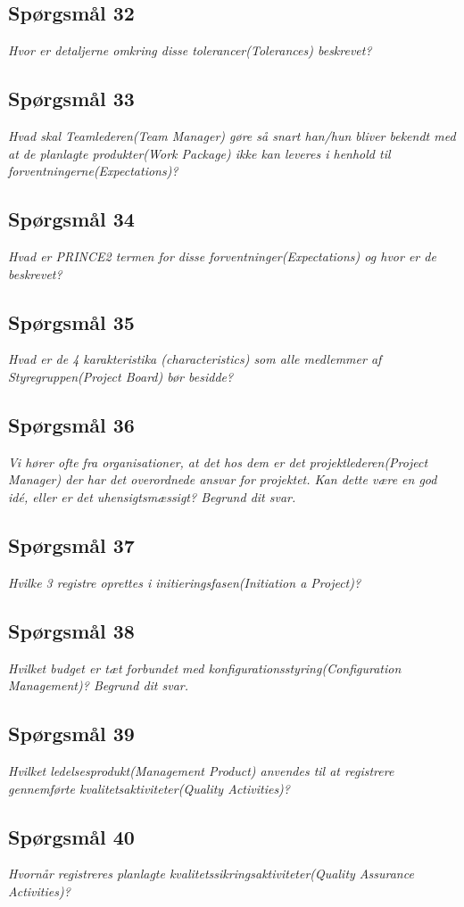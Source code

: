 \documentclass[12pt,twoside]{article}
\begin{document}
    \subsection{Spørgsmål 32}
    \textit{Hvor er detaljerne omkring disse tolerancer(Tolerances) beskrevet?}
    \subsection{Spørgsmål 33}
    \textit{Hvad skal Teamlederen(Team Manager) gøre så snart han/hun bliver bekendt med at de planlagte produkter(Work Package) ikke kan leveres i henhold til forventningerne(Expectations)?}
    \subsection{Spørgsmål 34}
    \textit{Hvad er PRINCE2 termen for disse forventninger(Expectations) og hvor er de beskrevet?}
    \subsection{Spørgsmål 35}
    \textit{Hvad er de 4 karakteristika (characteristics) som alle medlemmer af Styregruppen(Project Board) bør besidde?}
    \subsection{Spørgsmål 36}
    \textit{Vi hører ofte fra organisationer, at det hos dem er det projektlederen(Project Manager) der har det overordnede ansvar for projektet. Kan dette være en god idé, eller er det uhensigtsmæssigt? Begrund dit svar.}
    \subsection{Spørgsmål 37}
    \textit{Hvilke 3 registre oprettes i initieringsfasen(Initiation a Project)?}
    \subsection{Spørgsmål 38}
    \textit{Hvilket budget er tæt forbundet med konfigurationsstyring(Configuration Management)? Begrund dit svar.}
    \subsection{Spørgsmål 39}
    \textit{Hvilket ledelsesprodukt(Management Product) anvendes til at registrere gennemførte kvalitetsaktiviteter(Quality Activities)?}
    \subsection{Spørgsmål 40}
    \textit{Hvornår registreres planlagte kvalitetssikringsaktiviteter(Quality Assurance Activities)?}
\end{document}
